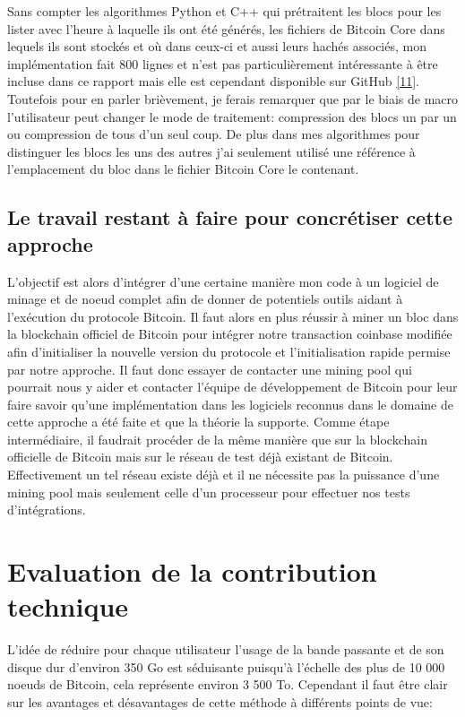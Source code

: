 \documentclass[12pt,a4paper]{article}
\newcommand{\source}[1]{\hyperlink{#1}{[#1]}}
\begin{document}
	Sans compter les algorithmes Python et C++ qui prétraitent les blocs pour les lister avec l'heure à laquelle ils ont été générés, les fichiers de Bitcoin Core dans lequels ils sont stockés et où dans ceux-ci et aussi leurs hachés associés, mon implémentation fait 800 lignes et n'est pas particulièrement intéressante à être incluse dans ce rapport mais elle est cependant disponible sur GitHub \source{11}. Toutefois pour en parler brièvement, je ferais remarquer que par le biais de macro l'utilisateur peut changer le mode de traitement: compression des blocs un par un ou compression de tous d'un seul coup. De plus dans mes algorithmes pour distinguer les blocs les uns des autres j'ai seulement utilisé une référence à l'emplacement du bloc dans le fichier Bitcoin Core le contenant. %
	
	\subsection{Le travail restant à faire pour concrétiser cette approche}
	
	L'objectif est alors d'intégrer d'une certaine manière mon code à un logiciel de minage et de noeud complet afin de donner de potentiels outils aidant à l'exécution du protocole Bitcoin. Il faut alors en plus réussir à miner un bloc dans la blockchain officiel de Bitcoin pour intégrer notre transaction coinbase modifiée afin d'initialiser la nouvelle version du protocole et l'initialisation rapide permise par notre approche. Il faut donc essayer de contacter une mining pool qui pourrait nous y aider et contacter l'équipe de développement de Bitcoin pour leur faire savoir qu'une implémentation dans les logiciels reconnus dans le domaine de cette approche a été faite et que la théorie la supporte. Comme étape intermédiaire, il faudrait procéder de la même manière que sur la blockchain officielle de Bitcoin mais sur le réseau de test déjà existant de Bitcoin. Effectivement un tel réseau existe déjà et il ne nécessite pas la puissance d'une mining pool mais seulement celle d'un processeur pour effectuer nos tests d'intégrations.\\
		
	\section{Evaluation de la contribution technique} %
	
	L'idée de réduire pour chaque utilisateur l'usage de la bande passante et de son disque dur d'environ 350 Go est séduisante puisqu'à l'échelle des plus de 10 000 noeuds de Bitcoin, cela représente environ 3 500 To. Cependant il faut être clair sur les avantages et désavantages de cette méthode à différents points de vue:
	
\end{document}
